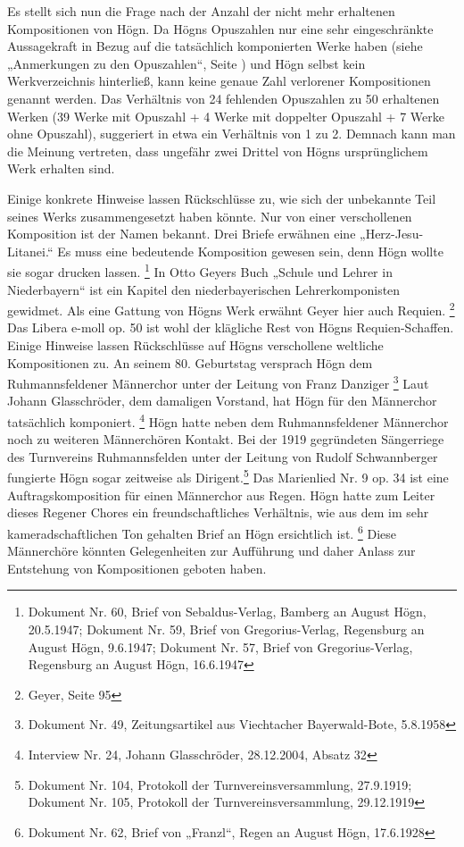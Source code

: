 Es stellt sich nun die Frage nach der Anzahl der nicht mehr erhaltenen
Kompositionen von Högn. Da Högns Opuszahlen nur eine sehr
eingeschränkte Aussagekraft in Bezug auf die tatsächlich komponierten
Werke haben (siehe  „Anmerkungen zu den
Opuszahlen“, Seite ) und Högn selbst kein
Werkverzeichnis hinterließ, kann keine genaue Zahl verlorener
Kompositionen genannt werden. Das Verhältnis von 24 fehlenden
Opuszahlen zu 50 erhaltenen Werken (39 Werke mit Opuszahl + 4 Werke mit
doppelter Opuszahl + 7 Werke ohne Opuszahl), suggeriert in etwa ein
Verhältnis von 1 zu 2. Demnach kann man die Meinung vertreten, dass
ungefähr zwei Drittel von Högns ursprünglichem Werk erhalten sind.

Einige konkrete Hinweise lassen Rückschlüsse zu, wie sich der unbekannte
Teil seines Werks zusammengesetzt haben könnte. Nur von einer
verschollenen Komposition ist der Namen bekannt. Drei Briefe erwähnen
eine „Herz-Jesu-Litanei.“ Es muss eine bedeutende Komposition gewesen
sein, denn Högn wollte sie sogar drucken lassen.
\footnote{Dokument Nr. 60, Brief von Sebaldus-Verlag, Bamberg an August Högn, 20.5.1947;
Dokument Nr. 59, Brief von Gregorius-Verlag, Regensburg an August Högn, 9.6.1947;
Dokument Nr. 57, Brief von Gregorius-Verlag, Regensburg an August Högn, 16.6.1947}
In Otto
Geyers Buch „Schule und Lehrer in Niederbayern“ ist ein Kapitel den
niederbayerischen Lehrerkomponisten gewidmet. Als eine Gattung von
Högns Werk erwähnt Geyer hier auch Requien. \footnote{Geyer, Seite 95}
Das Libera e-moll op. 50 ist wohl der klägliche Rest von Högns
Requien-Schaffen. Einige Hinweise lassen Rückschlüsse auf Högns
verschollene weltliche Kompositionen zu. An seinem 80. Geburtstag
versprach Högn dem Ruhmannsfeldener Männerchor unter der Leitung von
Franz Danziger  \footnote{Dokument Nr. 49, Zeitungsartikel aus
Viechtacher Bayerwald-Bote, 5.8.1958} Laut Johann Glasschröder, dem
damaligen Vorstand, hat Högn für den Männerchor tatsächlich
komponiert. \footnote{Interview Nr. 24, Johann Glasschröder,
28.12.2004, Absatz 32} Högn hatte neben dem Ruhmannsfeldener Männerchor
noch zu weiteren Männerchören Kontakt. Bei der 1919 gegründeten
Sängerriege des Turnvereins Ruhmannsfelden unter der Leitung von Rudolf
Schwannberger fungierte Högn sogar zeitweise als Dirigent.\footnote{
Dokument Nr. 104, Protokoll der Turnvereinsversammlung, 27.9.1919;
Dokument Nr. 105, Protokoll der Turnvereinsversammlung, 29.12.1919} Das
Marienlied Nr. 9 op. 34 ist eine Auftragskomposition für einen
Männerchor aus Regen. Högn hatte zum Leiter dieses Regener Chores ein
freundschaftliches Verhältnis, wie aus dem im sehr kameradschaftlichen
Ton gehalten Brief an Högn ersichtlich ist. \footnote{Dokument Nr. 62,
Brief von „Franzl“, Regen an August Högn, 17.6.1928} Diese Männerchöre
könnten Gelegenheiten zur Aufführung und daher Anlass zur Entstehung
von Kompositionen geboten haben.

